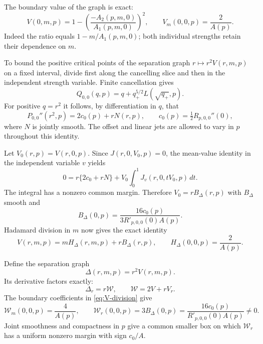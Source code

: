 The boundary value of the graph is exact:
\begin{equation}\label{eq:V-boundary}
 V(0,m,p)=1-\left(\frac{-A_2(p,m,0)}{A_1(p,m,0)}\right)^2,
 \qquad V_m(0,0,p)=\frac{2}{A(p)}.
\end{equation}
Indeed the ratio equals \(1-m/A_1(p,m,0)\); both individual strengths
retain their dependence on \(m\).

To bound the positive critical points of the separation graph
\(r\mapsto r^2V(r,m,p)\) on a fixed interval, divide first along
the cancelling slice and then in the independent strength variable.
Finite cancellation gives
\begin{equation}\label{eq:Q-aligned}
 Q_{0,0}(q,p)=q+q_+^{5/2}L(\sqrt{q_+},p).
\end{equation}
For positive \(q=r^2\) it follows, by differentiation in \(q\),
that
\begin{equation}\label{eq:center-curvature}
 P_{0,0}''(r^2,p)=2c_0(p)+rN(r,p),\qquad
 c_0(p)=\tfrac12R_{p,0,0}''(0),
\end{equation}
where \(N\) is jointly smooth. The offset and linear jets are allowed
to vary in \(p\) throughout this identity.

Let \(V_0(r,p)=V(r,0,p)\). Since \(J(r,0,V_0,p)=0\), the mean-value
identity in the independent variable \(v\) yields
\[
 0=r\{2c_0+rN\}
       +V_0\int_0^1J_v(r,0,tV_0,p)\,dt.
\]
The integral has a nonzero common margin. Therefore \(V_0=rB_\Delta(r,p)\)
with \(B_\Delta\) smooth and
\begin{equation}\label{eq:B-boundary}
 B_\Delta(0,p)=\frac{16c_0(p)}{3R'_{p,0,0}(0)A(p)}.
\end{equation}
Hadamard division in \(m\) now gives the exact identity
\begin{equation}\label{eq:V-division}
 V(r,m,p)=mH_\Delta(r,m,p)+rB_\Delta(r,p),\qquad
 H_\Delta(0,0,p)=\frac{2}{A(p)}.
\end{equation}

Define the separation graph
\begin{equation}\label{eq:Delta-definition}
 \Delta(r,m,p)=r^2V(r,m,p).
\end{equation}
Its derivative factors exactly:
\begin{equation}\label{eq:Delta-derivative}
 \Delta_r=r\mathcal W,\qquad \mathcal W=2V+rV_r.
\end{equation}
The boundary coefficients in \eqref{eq:V-division} give
\begin{equation}\label{eq:W-boundary}
 \mathcal W_m(0,0,p)=\frac4{A(p)},\qquad
 \mathcal W_r(0,0,p)=3B_\Delta(0,p)
   =\frac{16c_0(p)}{R'_{p,0,0}(0)A(p)}\ne0.
\end{equation}
Joint smoothness and compactness in \(p\) give a common smaller box
on which \(\mathcal W_r\) has a uniform nonzero margin with sign
\(c_0/A\).

